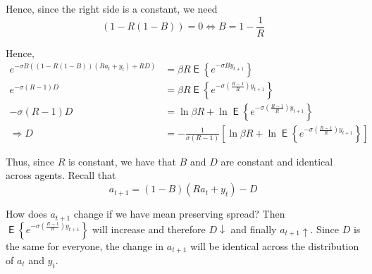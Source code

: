\documentclass[12pt]{article}
\newcommand{\1}{{\bf 1}} %
\DeclareMathOperator{\E}{\mathsf{E}} %
\newcommand{\Ex}[1]{\E\left\{#1\right\}} %
\begin{document}
Hence, since the right side is a constant, we need 
\[
(1-R(1-B))=0 \Leftrightarrow B = 1-\frac{1}{R}
\]

Hence,
\begin{align*}
e^{-\sigma B((1-R(1-B))(Ra_t+y_t)+RD)} & =\beta R \Ex{e^{-\sigma B y_{t+1}}}\\
e^{-\sigma (R-1)D} & =\beta R \Ex{e^{-\sigma \left( \frac{R-1}{R}\right) y_{t+1}}}\\
-\sigma (R-1)D& = \ln{\beta R}+\ln{\Ex{e^{-\sigma \left( \frac{R-1}{R}\right) y_{t+1}}}}\\
\Rightarrow D& = -\frac{1}{\sigma (R-1)} \left[ \ln{\beta R}+\ln{\Ex{e^{-\sigma \left( \frac{R-1}{R}\right)  y_{t+1}}}}\right]
\end{align*}

Thus, since $R$ is constant, we have that $B$ and $D$ are constant and identical across agents. Recall that 
\[
a_{t+1} = (1-B)(Ra_t+y_t)-D
\]

How does $a_{t+1}$ change if we have mean preserving spread? Then $\Ex{e^{-\sigma \left( \frac{R-1}{R}\right)  y_{t+1}}}$ will increase and therefore $D\downarrow$ and finally $a_{t+1} \uparrow$. Since $D$ is the same for everyone, the change in $a_{t+1}$ will be identical across the distribution of $a_t$ and $y_t$.
\end{document}
